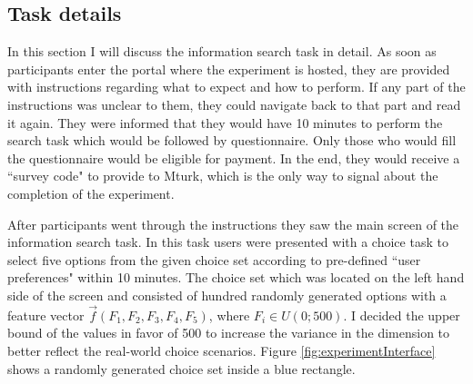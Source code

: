 \documentclass[a4paper,12pt]{article}
\begin{document}
\subsection{Task details}

In this section I will discuss the information search task in detail. As soon as participants enter the portal where the experiment is hosted, they are provided with instructions regarding what to expect and how to perform. If any part of the instructions was unclear to them, they could navigate back to that part and read it again. They were informed that they would have 10 minutes to perform the search task which would be followed by questionnaire. Only those who would fill the questionnaire would be eligible for payment. In the end, they would receive a ``survey code" to provide to Mturk, which is the only way to signal about the completion of the experiment. 

After participants went through the instructions they saw the main screen of the information search task. In this task users were presented with a choice task to select five options from the given choice set according to pre-defined ``user preferences" within 10 minutes. The choice set which was located on the left hand side of the screen and consisted of hundred randomly generated options with a feature vector $\vec f(F_1, F_2, F_3, F_4, F_5)$, where $ F_i \in U(0; 500)$. I decided the upper bound of the values in favor of 500 to increase the variance in the dimension to better reflect the real-world choice scenarios. Figure \ref{fig:experimentInterface} shows a randomly generated choice set inside a blue rectangle.
\end{document}
